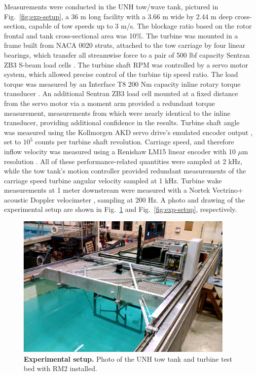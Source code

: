 \documentclass[10pt,letterpaper]{article}
\begin{document}
Measurements were conducted in the UNH tow/wave tank, pictured in
Fig.~\ref{fig:exp-setup}, a 36 m long facility with a 3.66 m wide by 2.44 m deep
cross-section, capable of tow speeds up to 3 m/s. The blockage ratio based on
the rotor frontal and tank cross-sectional area was 10\%. The turbine was
mounted in a frame built from NACA 0020 struts, attached to the tow carriage by
four linear bearings, which transfer all streamwise force to a pair of 500 lbf
capacity Sentran ZB3 S-beam load cells \cite{SentranZB}. The turbine shaft RPM
was controlled by a servo motor system, which allowed precise control of the
turbine tip speed ratio. The load torque was measured by an Interface T8 200 Nm
capacity inline rotary torque transducer \cite{InterfaceT8}. An additional
Sentran ZB3 load cell mounted at a fixed distance from the servo motor via a
moment arm provided a redundant torque measurement, measurements from which were
nearly identical to the inline transducer, providing additional confidence in
the results. Turbine shaft angle was measured using the Kollmorgen AKD servo
drive's emulated encoder output \cite{KollmorgenAKD}, set to $10^5$ counts per
turbine shaft revolution. Carriage speed, and therefore inflow velocity was
measured using a Renishaw LM15 linear encoder with 10 $\mu$m resolution
\cite{RenishawLM15}. All of these performance-related quantities were sampled at
2 kHz, while the tow tank's motion controller provided redundant measurements of
the carriage speed turbine angular velocity sampled at 1 kHz. Turbine wake
measurements at 1 meter downstream were measured with a Nortek Vectrino+
acoustic Doppler velocimeter \cite{NortekVectrino}, sampling at 200 Hz. A photo
and drawing of the experimental setup are shown in
Fig.~\ref{fig:exp-setup-photo} and Fig.~\ref{fig:exp-setup}, respectively.

\begin{figure}
    \centering

    \includegraphics[width=0.95\textwidth]{figures/exp-setup-photo}

    \caption{\textbf{Experimental setup.} Photo of the UNH tow tank and turbine
    test bed with RM2 installed.}

    \label{fig:exp-setup-photo}
\end{figure}
\end{document}

